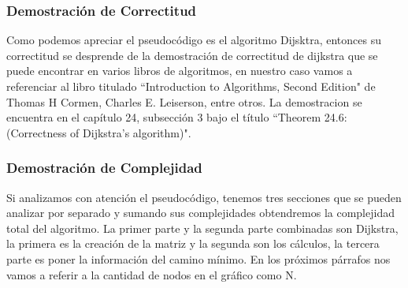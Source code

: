 \documentclass[spanish,12pt]{article}
\begin{document}
\newpage

\subsubsection{Demostración de Correctitud}
Como podemos apreciar el pseudocódigo es el algoritmo Dijsktra, entonces su correctitud se desprende de la demostración de correctitud de dijkstra que se puede encontrar en varios libros de algoritmos, en nuestro caso vamos a referenciar al libro titulado ``Introduction to Algorithms, Second Edition"  de Thomas H Cormen, Charles E. Leiserson, entre otros. La demostracion se encuentra en el capítulo 24, subsección 3 bajo el título ``Theorem 24.6: (Correctness of Dijkstra's algorithm)".

\subsubsection{Demostración de Complejidad}

Si analizamos con atención el pseudocódigo, tenemos tres secciones que se pueden analizar por separado y sumando sus complejidades obtendremos la complejidad total del algoritmo. La primer parte y la segunda parte combinadas son Dijkstra, la primera es la creación de la matriz y la segunda son los cálculos, la tercera parte es poner la información del camino mínimo. En los próximos párrafos nos vamos a referir a la cantidad de nodos en el gráfico como N. 
\end{document}
